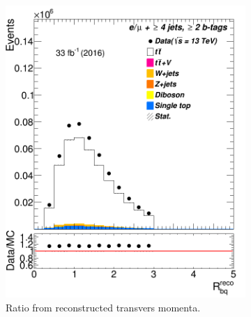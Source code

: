 \begin{figure} %
	\centering	
	\begin{subfigure}{0.35\textwidth}
		\includegraphics[width=\linewidth]{ControlPlots_emujets_2016_4incl_2incl/klf_original_Rbq_reco_emujets_2016.png}
		\caption{Ratio from reconstructed transvers momenta.} \label{fig:klf171}
	\end{subfigure}	
	\hspace*{1.5cm}	
	\begin{subfigure}{0.35\textwidth}

\end{subfigure}
\end{figure}

